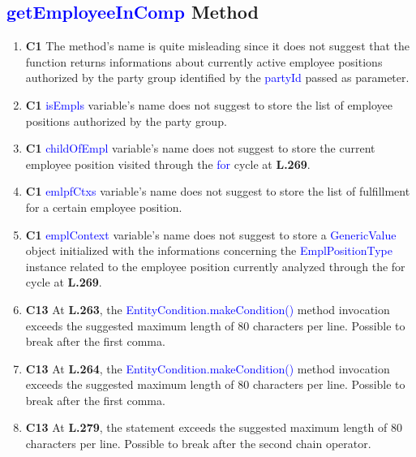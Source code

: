 \subsection{\textcolor{blue}{getEmployeeInComp} Method}

\begin{enumerate}
	\item \textbf{C1} The method's name is quite misleading since it does not suggest that the function returns informations about currently active employee positions authorized by the party group identified by the \textcolor{blue}{partyId} passed as parameter.

	\item \textbf{C1} \textcolor{blue}{isEmpls} variable's name does not suggest to store the list of employee positions authorized by the party group.

	\item \textbf{C1} \textcolor{blue}{childOfEmpl} variable's name does not suggest to store the current employee position visited through the \textcolor{blue}{for} cycle at \textbf{L.269}.

	\item \textbf{C1} \textcolor{blue}{emlpfCtxs} variable's name does not suggest to store the list of fulfillment for a certain employee position.

	\item \textbf{C1} \textcolor{blue}{emplContext} variable's name does not suggest to store a \textcolor{blue}{GenericValue} object initialized with the informations concerning the \textcolor{blue}{EmplPositionType} instance related to the employee position currently analyzed through the for cycle at \textbf{L.269}.

	\item \textbf{C13} At \textbf{L.263}, the \textcolor{blue}{EntityCondition.makeCondition()} method invocation exceeds the suggested maximum length of 80 characters per line. Possible to break after the first comma.

	\item \textbf{C13} At \textbf{L.264}, the \textcolor{blue}{EntityCondition.makeCondition()} method invocation exceeds the suggested maximum length of 80 characters per line. Possible to break after the first comma.

	\item \textbf{C13} At \textbf{L.279}, the statement exceeds the suggested maximum length of 80 characters per line. Possible to break after the second chain operator.


\end{enumerate}
